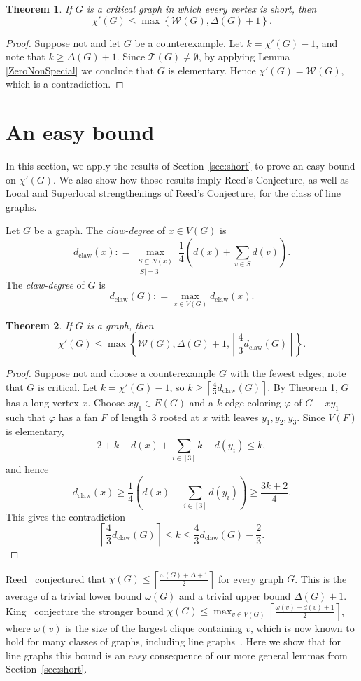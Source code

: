 \documentclass[12pt]{amsart}
\theoremstyle{plain}
\newtheorem{thm}{Theorem}
\theoremstyle{definition}
\theoremstyle{remark}
\newcommand{\fancy}[1]{\mathcal{#1}}
\newcommand{\W}{\fancy{W}}
\newcommand{\T}{\fancy{T}}
\newcommand{\set}[1]{\left\{ #1 \right\}}
\newcommand{\card}[1]{\left|#1\right|}
\newcommand{\ceil}[1]{\left\lceil#1\right\rceil}
\newcommand{\irange}[1]{\left[#1\right]}
\newcommand{\parens}[1]{\left( #1 \right)}
\newcommand{\DefinedAs}{\mathrel{\mathop:}=}
\newcommand{\dclaw}[1]{d_{\text{claw}}\left( #1 \right)}
\newcommand{\vph}{\varphi}
\def\aftermath{\par\vspace{-\belowdisplayskip}\vspace{-\parskip}\vspace{-\baselineskip}}
\begin{document}
\begin{thm}\label{AllSpecialImpliesElementary}
If $G$ is a critical graph in which every vertex is short, then
\[\chi'(G) \le \max \set{\W(G), \Delta(G) + 1}.\]
\end{thm}
\begin{proof}
Suppose not and let $G$ be a counterexample. %
Let $k = \chi'(G) - 1$, and note that $k \ge \Delta(G) + 1$.  
Since $\T(G) \ne \emptyset$, by applying Lemma \ref{ZeroNonSpecial} we conclude
that $G$ is elementary.  Hence $\chi'(G) = \W(G)$, which is a
contradiction.
\end{proof}

\section{An easy bound}
In this section, we apply the results of Section~\ref{sec:short} to prove an
easy bound on $\chi'(G)$.  We also show how those results imply Reed's Conjecture, as
well as Local and Superlocal strengthenings of Reed's Conjecture, for the class
of line graphs.

Let $G$ be a graph.  The \emph{claw-degree} of $x \in V(G)$ is 
\[\dclaw{x} \DefinedAs \max_{\substack{S \subseteq N(x) \\ \card{S} = 3}}\frac14 \parens{d(x) + \sum_{v \in S} d(v)}.\]
The \emph{claw-degree} of $G$ is 
\[\dclaw{G} \DefinedAs \max_{x \in V(G)} \dclaw{x}.\]
\begin{thm}
\label{EasyBound}
If $G$ is a graph, then
\[\chi'(G) \le \max\set{\W(G), \Delta(G) + 1, \ceil{\frac43\dclaw{G}}}.\]
\end{thm}
\begin{proof}
Suppose not and choose a counterexample $G$ with the fewest edges; note that $G$
is critical. 
Let $k=\chi'(G)-1$, so $k \ge \ceil{\frac43\dclaw{G}}$. 
By Theorem \ref{AllSpecialImpliesElementary}, $G$ has a long vertex $x$.
Choose $xy_1 \in E(G)$ and a $k$-edge-coloring $\vph$ of $G - xy_1$ such that
$\vph$ has a fan $F$ of length $3$ rooted at $x$ with leaves $y_1, y_2, y_3$.  
Since $V(F)$ is elementary, 
\[2 + k - d(x) + \sum_{i \in \irange{3}} k-d(y_i) \le k,\]
and hence
\[\dclaw{x} \ge \frac14\parens{d(x) + \sum_{i \in \irange{3}} d(y_i)} \ge \frac{3k+2}{4}.\]
This gives the contradiction
\[\ceil{\frac43\dclaw{G}} \le k \le \frac43\dclaw{G} - \frac23.\]
\aftermath
\end{proof}

Reed~\cite{Reed1998omega} conjectured that $\chi(G)\le
\ceil{\frac{\omega(G)+\Delta+1}2}$ for every
graph $G$.  This is the average of a trivial lower bound $\omega(G)$ and a
trivial upper bound $\Delta(G)+1$.  King~\cite{King} conjecture the stronger
bound $\chi(G)\le \max_{v\in V(G)}\ceil{\frac{\omega(v)+d(v)+1}2}$, where
$\omega(v)$ is the size of the largest clique containing $v$, which is now known
to hold for many classes of graphs, including line graphs~\cite{CKPS}.  Here we
show that for line graphs this bound is an easy consequence of our more general
lemmas from Section~\ref{sec:short}.  
\end{document}
